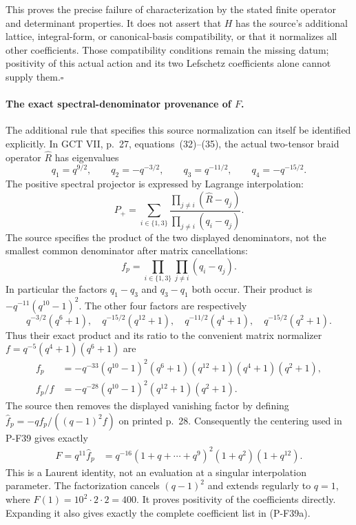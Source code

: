 \documentclass[11pt,a4paper]{article}
\begin{document}
This proves the precise failure of characterization by the stated
finite operator and determinant properties. It does not assert
that $H$ has the source's additional lattice, integral-form, or
canonical-basis compatibility, or that it normalizes all other
coefficients. Those compatibility conditions remain the missing
datum; positivity of this actual action and its two Lefschetz
coefficients alone cannot supply them.\hfill$\square$

\paragraph{The exact spectral-denominator provenance of $F$.}
The additional rule that specifies this source normalization can
itself be identified explicitly. In GCT VII, p.~27,
equations~(32)--(35), the actual two-tensor braid operator
$\widehat R$ has eigenvalues
\[
       q_1=q^{9/2},\qquad q_2=-q^{-3/2},\qquad
       q_3=q^{-11/2},\qquad q_4=-q^{-15/2}.                    \tag{P-F52q}
\]
The positive spectral projector is expressed by Lagrange interpolation:
\[
  P_+=\sum_{i\in\{1,3\}}
       \frac{\prod_{j\ne i}(\widehat R-q_j)}
            {\prod_{j\ne i}(q_i-q_j)}.
\]
The source specifies the product of the two displayed denominators,
not the smallest common denominator after matrix cancellations:
\[
 f_p=\prod_{i\in\{1,3\}}\prod_{j\ne i}(q_i-q_j).
                                                               \tag{P-F52r}
\]
In particular the factors $q_1-q_3$ and $q_3-q_1$ both occur.
Their product is $-q^{-11}(q^{10}-1)^2$. The other four factors
are respectively
\[
 q^{-3/2}(q^6+1),\quad q^{-15/2}(q^{12}+1),\quad
 q^{-11/2}(q^4+1),\quad q^{-15/2}(q^2+1).
\]
Thus their exact product and its ratio to the convenient matrix
normalizer $f=q^{-5}(q^4+1)(q^6+1)$ are
\[
 \begin{split}
 f_p&=-q^{-33}(q^{10}-1)^2(q^6+1)(q^{12}+1)(q^4+1)(q^2+1),\\
 f_p/f&=-q^{-28}(q^{10}-1)^2(q^{12}+1)(q^2+1).
 \end{split}
\]
The source then removes the displayed vanishing factor by defining
$\widehat f_p=-q f_p/((q-1)^2f)$ on printed p.~28.
Consequently the centering used in P-F39 gives exactly
\[
 \begin{split}
 F=q^{11}\widehat f_p
  &=q^{-16}(1+q+\cdots+q^9)^2(1+q^2)(1+q^{12}).
 \end{split}                                                    \tag{P-F52s}
\]
This is a Laurent identity, not an evaluation at a singular
interpolation parameter. The factorization cancels $(q-1)^2$
and extends regularly to $q=1$, where $F(1)=10^2\cdot2\cdot2=400$.
It proves positivity of the coefficients directly. Expanding it
also gives exactly the complete coefficient list in (P-F39a).
\end{document}
